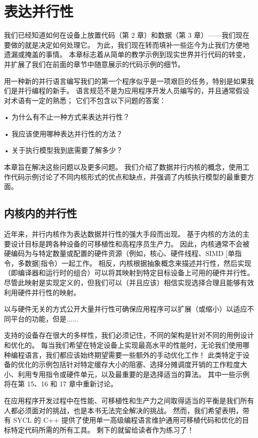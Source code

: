 \section{表达并行性}
我们已经知道如何在设备上放置代码（第 2 章）和数据（第 3 章）——我们现在要做的就是决定如何处理它。 为此，我们现在转而填补一些迄今为止我们方便地遗漏或掩盖的事情。 本章标志着从简单的教学示例到现实世界并行代码的转变，并扩展了我们在前面的章节中随意展示的代码示例的细节。

用一种新的并行语言编写我们的第一个程序似乎是一项艰巨的任务，特别是如果我们是并行编程的新手。 语言规范不是为应用程序开发人员编写的，并且通常假设对术语有一定的熟悉； 它们不包含以下问题的答案：

• 为什么有不止一种方式来表达并行性？

• 我应该使用哪种表达并行性的方法？

• 关于执行模型我到底需要了解多少？

本章旨在解决这些问题以及更多问题。 我们介绍了数据并行内核的概念，使用工作代码示例讨论了不同内核形式的优点和缺点，并强调了内核执行模型的最重要方面。

\subsection{内核内的并行性}
近年来，并行内核作为表达数据并行性的强大手段而出现。 基于内核的方法的主要设计目标是跨各种设备的可移植性和高程序员生产力。 因此，内核通常不会被硬编码为与特定数量或配置的硬件资源（例如，核心、硬件线程、SIMD [单指令，多数据]指令）一起工作。 相反，内核根据抽象概念来描述并行性，然后实现（即编译器和运行时的组合）可以将其映射到特定目标设备上可用的硬件并行性。 尽管此映射是实现定义的，但我们可以（并且应该）相信实现选择合理且能够有效利用硬件并行性的映射。

以与硬件无关的方式公开大量并行性可确保应用程序可以扩展（或缩小）以适应不同平台的功能，但是......

支持的设备存在很大的多样性，我们必须记住，不同的架构是针对不同的用例设计和优化的。 每当我们希望在特定设备上实现最高水平的性能时，无论我们使用哪种编程语言，我们都应该始终期望需要一些额外的手动优化工作！ 此类特定于设备的优化的示例包括针对特定缓存大小的阻塞、选择分摊调度开销的工作粒度大小、利用专用指令或硬件单元，以及最重要的是选择适当的算法。 其中一些示例将在第 15、16 和 17 章中重新讨论。

在应用程序开发过程中在性能、可移植性和生产力之间取得适当的平衡是我们所有人都必须面对的挑战，也是本书无法完全解决的挑战。 然而，我们希望表明，带有 SYCL 的 C++ 提供了使用单一高级编程语言维护通用可移植代码和优化的目标特定代码所需的所有工具。 剩下的就留给读者作为练习了！

